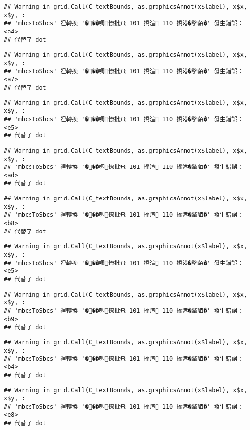 \documentclass[
]{article}
\begin{document}
\begin{verbatim}
## Warning in grid.Call(C_textBounds, as.graphicsAnnot(x$label), x$x, x$y, :
## 'mbcsToSbcs' 裡轉換 '���啁憭批飛 101 撟渲 110 撟港�摮貊�' 發生錯誤：<a4>
## 代替了 dot
\end{verbatim}

\begin{verbatim}
## Warning in grid.Call(C_textBounds, as.graphicsAnnot(x$label), x$x, x$y, :
## 'mbcsToSbcs' 裡轉換 '���啁憭批飛 101 撟渲 110 撟港�摮貊�' 發生錯誤：<a7>
## 代替了 dot
\end{verbatim}

\begin{verbatim}
## Warning in grid.Call(C_textBounds, as.graphicsAnnot(x$label), x$x, x$y, :
## 'mbcsToSbcs' 裡轉換 '���啁憭批飛 101 撟渲 110 撟港�摮貊�' 發生錯誤：<e5>
## 代替了 dot
\end{verbatim}

\begin{verbatim}
## Warning in grid.Call(C_textBounds, as.graphicsAnnot(x$label), x$x, x$y, :
## 'mbcsToSbcs' 裡轉換 '���啁憭批飛 101 撟渲 110 撟港�摮貊�' 發生錯誤：<ad>
## 代替了 dot
\end{verbatim}

\begin{verbatim}
## Warning in grid.Call(C_textBounds, as.graphicsAnnot(x$label), x$x, x$y, :
## 'mbcsToSbcs' 裡轉換 '���啁憭批飛 101 撟渲 110 撟港�摮貊�' 發生錯誤：<b8>
## 代替了 dot
\end{verbatim}

\begin{verbatim}
## Warning in grid.Call(C_textBounds, as.graphicsAnnot(x$label), x$x, x$y, :
## 'mbcsToSbcs' 裡轉換 '���啁憭批飛 101 撟渲 110 撟港�摮貊�' 發生錯誤：<e5>
## 代替了 dot
\end{verbatim}

\begin{verbatim}
## Warning in grid.Call(C_textBounds, as.graphicsAnnot(x$label), x$x, x$y, :
## 'mbcsToSbcs' 裡轉換 '���啁憭批飛 101 撟渲 110 撟港�摮貊�' 發生錯誤：<b9>
## 代替了 dot
\end{verbatim}

\begin{verbatim}
## Warning in grid.Call(C_textBounds, as.graphicsAnnot(x$label), x$x, x$y, :
## 'mbcsToSbcs' 裡轉換 '���啁憭批飛 101 撟渲 110 撟港�摮貊�' 發生錯誤：<b4>
## 代替了 dot
\end{verbatim}

\begin{verbatim}
## Warning in grid.Call(C_textBounds, as.graphicsAnnot(x$label), x$x, x$y, :
## 'mbcsToSbcs' 裡轉換 '���啁憭批飛 101 撟渲 110 撟港�摮貊�' 發生錯誤：<e8>
## 代替了 dot
\end{verbatim}
\end{document}

